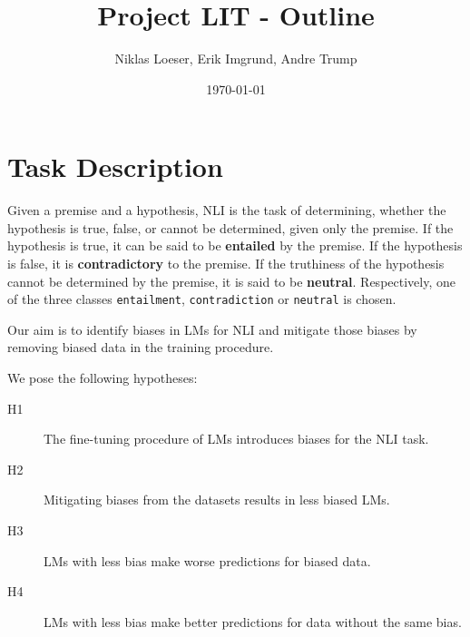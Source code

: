 \documentclass[12pt,a4paper]{article}
\title{Project LIT - Outline}
\author{Niklas Loeser, Erik Imgrund, Andre Trump}
\date{\today}
\begin{document}
\begin{acronym}
\end{acronym}

\maketitle

\section{Task Description}
Given a premise and a hypothesis, \ac{NLI} is the task of determining, whether the hypothesis is true, false, or cannot be determined, given only the premise. If the hypothesis is true, it can be said to be \textbf{entailed} by the premise. If the hypothesis is false, it is \textbf{contradictory} to the premise. If the truthiness of the hypothesis cannot be determined by the premise, it is said to be \textbf{neutral}. Respectively, one of the three classes \texttt{entailment}, \texttt{contradiction} or \texttt{neutral} is chosen.

Our aim is to identify biases in \acp{LM} for \ac{NLI} and mitigate those biases by removing biased data in the training procedure.

We pose the following hypotheses:\vspace{-1.5em}
\begin{description}
  \item[H1] The fine-tuning procedure of \acp{LM} introduces biases for the \ac{NLI} task.\vspace{-0.7em}
  \item[H2] Mitigating biases from the datasets results in less biased \acp{LM}.\vspace{-0.7em}
  \item[H3] \acp{LM} with less bias make worse predictions for biased data. \vspace{-0.7em}%
  \item[H4] \acp{LM} with less bias make better predictions for data without the same bias.
\end{description}
\end{document}
